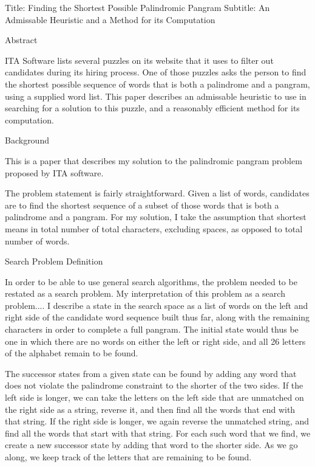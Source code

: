 Title: Finding the Shortest Possible Palindromic Pangram
Subtitle: An Admissable Heuristic and a Method for its Computation

Abstract

ITA Software lists several puzzles on its website that it uses to
filter out candidates during its hiring process. One of those puzzles
asks the person to find the shortest possible sequence of words that
is both a palindrome and a pangram, using a supplied word list. This 
paper describes an admissable heuristic to use in searching for a
solution to this puzzle, and a reasonably efficient method for its 
computation.

Background

This is a paper that describes my solution to the palindromic pangram
problem proposed by ITA software.

The problem statement is fairly straightforward. Given a list of
words, candidates are to find the shortest sequence of a subset
of those words that is both a palindrome and a pangram. For my
solution, I take the assumption that shortest means in total number of
total characters, excluding spaces, as opposed to total number of
words.

Search Problem Definition

In order to be able to use general search algorithms, the problem
needed to be restated as a search problem. My interpretation of this
problem as a search problem.... I describe a state in the search space
as a list of words on the left and right side of the candidate word
sequence built thus far, along with the remaining characters in order
to complete a full pangram. The initial state would thus be one in
which there are no words on either the left or right side, and all 26
letters of the alphabet remain to be found.

The successor states from a given state can be found by adding any
word that does not violate the palindrome constraint to the shorter of
the two sides. If the left side is longer, we can take the letters on
the left side that are unmatched on the right side as a string,
reverse it, and then find all the words that end with that string. If
the right side is longer, we again reverse the unmatched string, and
find all the words that start with that string. For each such word
that we find, we create a new successor state by adding that word to
the shorter side. As we go along, we keep track of the letters that
are remaining to be found.

